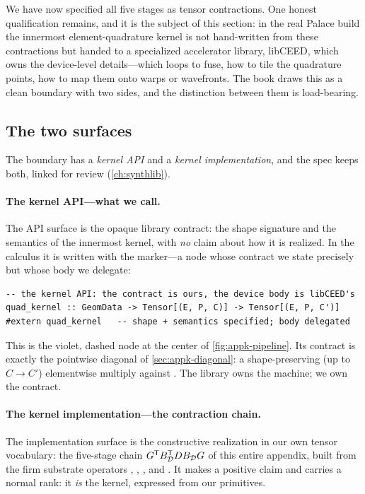 We have now specified all five stages as tensor contractions. One honest
qualification remains, and it is the subject of this section: in the real Palace
build the innermost element-quadrature kernel is not hand-written from these
contractions but handed to a specialized accelerator library, libCEED, which owns
the device-level details---which loops to fuse, how to tile the quadrature points,
how to map them onto warps or wavefronts. The book draws this as a clean boundary
with two sides, and the distinction between them is load-bearing.

\subsection{The two surfaces}

The boundary has a \emph{kernel API} and a \emph{kernel implementation}, and the
spec keeps both, linked for review (\cref{ch:synthlib}).

\paragraph{The kernel API---what we call.} The API surface is the opaque library
contract: the shape signature and the semantics of the innermost kernel, with
\emph{no} claim about how it is realized. In the calculus it is written with the
 marker---a node whose contract we state precisely but whose body we
delegate:
\begin{lstlisting}[style=l4style]
-- the kernel API: the contract is ours, the device body is libCEED's
quad_kernel :: GeomData -> Tensor[(E, P, C)] -> Tensor[(E, P, C')]
#extern quad_kernel   -- shape + semantics specified; body delegated
\end{lstlisting}
This is the violet, dashed  node at the center of
\cref{fig:appk-pipeline}. Its contract is exactly the pointwise diagonal of
\cref{sec:appk-diagonal}: a shape-preserving (up to $C\to C'$) elementwise multiply
against . The library owns the machine; we own the contract.

\paragraph{The kernel implementation---the contraction chain.} The implementation
surface is the constructive realization in our own tensor vocabulary: the five-stage
chain $G^{\mathsf T}B_{\mathcal{D}}^{\mathsf T}D B_{\mathcal{D}}G$ of this entire appendix,
built from the firm substrate operators , ,
, and . It makes a positive
claim and carries a normal rank: it \emph{is} the kernel, expressed from our
primitives.

